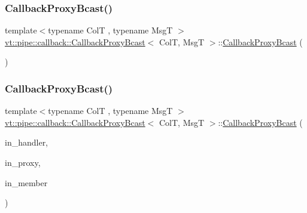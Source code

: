 \subsubsection{\texorpdfstring{Callback\+Proxy\+Bcast()}{CallbackProxyBcast()}\hspace{0.1cm}{\footnotesize\ttfamily [3/4]}}
{\footnotesize\ttfamily template$<$typename ColT , typename MsgT $>$ \\
\hyperlink{structvt_1_1pipe_1_1callback_1_1_callback_proxy_bcast}{vt\+::pipe\+::callback\+::\+Callback\+Proxy\+Bcast}$<$ ColT, MsgT $>$\+::\hyperlink{structvt_1_1pipe_1_1callback_1_1_callback_proxy_bcast}{Callback\+Proxy\+Bcast} (\begin{DoxyParamCaption}\item[{\hyperlink{structvt_1_1pipe_1_1callback_1_1_callback_proxy_bcast}{Callback\+Proxy\+Bcast}$<$ ColT, MsgT $>$ \&\&}]{ }\end{DoxyParamCaption})\hspace{0.3cm}{\ttfamily [default]}}

\mbox{\label{structvt_1_1pipe_1_1callback_1_1_callback_proxy_bcast_a046f6d76994fc3d87f3e92f9630690d0}} 
\subsubsection{\texorpdfstring{Callback\+Proxy\+Bcast()}{CallbackProxyBcast()}\hspace{0.1cm}{\footnotesize\ttfamily [4/4]}}
{\footnotesize\ttfamily template$<$typename ColT , typename MsgT $>$ \\
\hyperlink{structvt_1_1pipe_1_1callback_1_1_callback_proxy_bcast}{vt\+::pipe\+::callback\+::\+Callback\+Proxy\+Bcast}$<$ ColT, MsgT $>$\+::\hyperlink{structvt_1_1pipe_1_1callback_1_1_callback_proxy_bcast}{Callback\+Proxy\+Bcast} (\begin{DoxyParamCaption}\item[{\hyperlink{namespacevt_af64846b57dfcaf104da3ef6967917573}{Handler\+Type} const \&}]{in\+\_\+handler,  }\item[{\hyperlink{structvt_1_1pipe_1_1callback_1_1_callback_proxy_bcast_a27c62cb9cbd1dcd3f135dcd98d98c991}{Proxy\+Type} const \&}]{in\+\_\+proxy,  }\item[{bool const \&}]{in\+\_\+member }\end{DoxyParamCaption})\hspace{0.3cm}{\ttfamily [inline]}}




